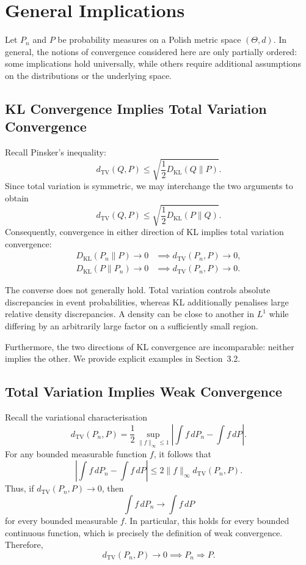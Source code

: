 \documentclass[
  11pt,
  a4paper,
  notitlepage
]{report}
\begin{document}
\section{General Implications}
\label{general-implications}

Let $P_n$ and $P$ be probability measures on a Polish
metric space $(\Theta,d)$. In general, the notions of
convergence considered here are only partially ordered:
some implications hold universally, while others require
additional assumptions on the distributions or the
underlying space.

\subsection{KL Convergence Implies Total Variation Convergence}

Recall Pinsker's inequality:
\[
d_{\mathrm{TV}}(Q,P)
\leq
\sqrt{\frac{1}{2}D_{\mathrm{KL}}(Q\|P)}.
\]
Since total variation is symmetric, we may interchange
the two arguments to obtain
\[
d_{\mathrm{TV}}(Q,P)
\leq
\sqrt{\frac{1}{2}D_{\mathrm{KL}}(P\|Q)}.
\]
Consequently, convergence in either direction of KL
implies total variation convergence:
\[
\boxed{
\begin{aligned}
D_{\mathrm{KL}}(P_n\|P)\to0
&\implies d_{\mathrm{TV}}(P_n,P)\to0,\\
D_{\mathrm{KL}}(P\|P_n)\to0
&\implies d_{\mathrm{TV}}(P_n,P)\to0.
\end{aligned}
}
\]

The converse does not generally hold. Total variation
controls absolute discrepancies in event probabilities,
whereas KL additionally penalises large relative density
discrepancies. A density can be close to another in
$L^1$ while differing by an arbitrarily large factor
on a sufficiently small region.

Furthermore, the two directions of KL convergence are
incomparable: neither implies the other. We provide
explicit examples in Section~3.2.

\subsection{Total Variation Implies Weak Convergence}

Recall the variational characterisation
\[
d_{\mathrm{TV}}(P_n,P)
=
\frac12
\sup_{\|f\|_\infty\leq1}
\left|
\int f\,dP_n-\int f\,dP
\right|.
\]
For any bounded measurable function $f$, it follows that
\[
\left|
\int f\,dP_n-\int f\,dP
\right|
\leq
2\|f\|_\infty d_{\mathrm{TV}}(P_n,P).
\]
Thus, if $d_{\mathrm{TV}}(P_n,P)\to0$, then
\[
\int f\,dP_n\longrightarrow\int f\,dP
\]
for every bounded measurable $f$. In particular,
this holds for every bounded continuous function,
which is precisely the definition of weak convergence.
Therefore,
\[
\boxed{
d_{\mathrm{TV}}(P_n,P)\to0
\implies P_n\Rightarrow P.
}
\]
\end{document}
